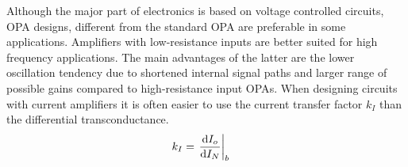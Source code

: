 Although the major part of electronics is based on voltage controlled circuits, \ac{OPA} designs, different from the standard \ac{OPA} are preferable in some applications. Amplifiers with low-resistance inputs are better suited for high frequency applications. The main advantages of the latter are the lower oscillation tendency due to shortened internal signal paths and larger range of possible gains compared to high-resistance input \ac{OPA}s. When designing circuits with current amplifiers it is often easier to use the current transfer factor $k_I$ than the differential transconductance.
\begin{align}
  k_I &= \eval{\dv{I_o}{I_N}}_{b}
\end{align}

\begin{figure}[!htb]
\end{figure}
